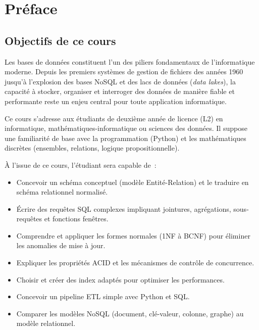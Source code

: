 \chapter*{Pr\'eface}

\section*{Objectifs de ce cours}

Les bases de donn\'ees constituent l'un des piliers fondamentaux de l'informatique
moderne. Depuis les premiers syst\`emes de gestion de fichiers des ann\'ees 1960
jusqu'\`a l'explosion des bases NoSQL et des lacs de donn\'ees (\emph{data lakes}),
la capacit\'e \`a stocker, organiser et interroger des donn\'ees de mani\`ere fiable
et performante reste un enjeu central pour toute application informatique.

Ce cours s'adresse aux \'etudiants de deuxi\`eme ann\'ee de licence (L2) en
informatique, math\'ematiques-informatique ou sciences des donn\'ees. Il suppose
une familiarit\'e de base avec la programmation (Python) et les math\'ematiques
discr\`etes (ensembles, relations, logique propositionnelle).

\`A l'issue de ce cours, l'\'etudiant sera capable de~:
\begin{itemize}
    \item Concevoir un sch\'ema conceptuel (mod\`ele Entit\'e-Relation) et le
          traduire en sch\'ema relationnel normalis\'e.
    \item \'Ecrire des requ\^etes SQL complexes impliquant jointures, agr\'egations,
          sous-requ\^etes et fonctions fen\^etres.
    \item Comprendre et appliquer les formes normales (1NF \`a BCNF) pour
          \'eliminer les anomalies de mise \`a jour.
    \item Expliquer les propri\'et\'es ACID et les m\'ecanismes de contr\^ole
          de concurrence.
    \item Choisir et cr\'eer des index adapt\'es pour optimiser les performances.
    \item Concevoir un pipeline ETL simple avec Python et SQL.
    \item Comparer les mod\`eles NoSQL (document, cl\'e-valeur, colonne, graphe)
          au mod\`ele relationnel.
\end{itemize}

